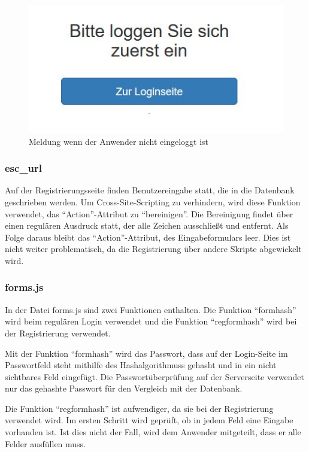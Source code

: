 \begin{figure} [htb]
\begin{centering}
\includegraphics{Bilder/Kapitel4/notloggedin.jpg}
\caption[Meldung wenn der Anwender nicht eingeloggt ist]{Meldung wenn der Anwender nicht eingeloggt ist}
\label{notloggedin}
\end{centering}
\end{figure}

\subsubsection{esc\_url}
Auf der Registrierungsseite finden Benutzereingabe statt, die in die Datenbank geschrieben werden. Um Cross-Site-Scripting zu verhindern, wird diese Funktion verwendet, das "`Action"'-Attribut zu "`bereinigen"'. Die Bereinigung findet über einen regulären Ausdruck statt, der alle Zeichen ausschließt und entfernt. Als Folge daraus bleibt das "`Action"'-Attribut, des Eingabeformulars leer. Dies ist nicht weiter problematisch, da die Registrierung über andere Skripte abgewickelt wird.
\subsubsection{forms.js}
In der Datei forms.js sind zwei Funktionen enthalten. Die Funktion "`formhash"' wird beim regulären Login verwendet und die Funktion "`regformhash"' wird bei der Registrierung verwendet. 

Mit der Funktion "`formhash"' wird das Passwort, dass auf der Login-Seite im Passwortfeld steht mithilfe des Hashalgorithmuss gehasht und in ein nicht sichtbares Feld eingefügt. Die Passwortüberprüfung auf der Serverseite verwendet nur das gehashte Passwort für den Vergleich mit der Datenbank.

Die Funktion "`regformhash"' ist aufwendiger, da sie bei der Registrierung verwendet wird. Im ersten Schritt wird geprüft, ob in jedem Feld eine Eingabe vorhanden ist. Ist dies nicht der Fall, wird dem Anwender mitgeteilt, dass er alle Felder ausfüllen muss.

